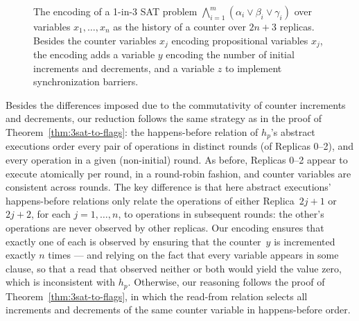     \begin{figure}[t]
      \centering
      {\scriptsize}
     \vspace{-1mm}
      \caption{The encoding of a 1-in-3 SAT problem $\bigwedge_{i=1}^{m} (\alpha_i \lor \beta_i \lor \gamma_i)$ over variables $x_1, \ldots, x_n$ as the history of a counter over $2n+3$ replicas. Besides the counter variables $x_j$ encoding propositional variables $x_j$, the encoding adds a variable $y$ encoding the number of initial increments and decrements, and a variable $z$ to implement synchronization barriers.}
      \label{fig:3sat-to-counter}
     \vspace{-4mm}
    \end{figure}

     Besides the differences imposed due to the commutativity of counter increments and decrements, our reduction follows the same strategy as in the proof of Theorem~\ref{thm:3sat-to-flags}: the happens-before relation of $h_p$’s abstract executions order every pair of operations in distinct rounds (of Replicas 0–2), and every operation in a given (non-initial) round. As before, Replicas 0–2 appear to execute atomically per round, in a round-robin fashion, and counter variables are consistent across rounds. The key difference is that here abstract executions’ happens-before relations only relate the operations of either Replica~$2j\!+\!1$ or $2j\!+\!2$, for each $j = 1, \ldots, n$, to operations in subsequent rounds: the other’s operations are never observed by other replicas. Our encoding ensures that exactly one of each is observed by ensuring that the counter~$y$ is incremented exactly $n$ times — and relying on the fact that every variable appears in some clause, so that a read that observed neither or both would yield the value zero, which is inconsistent with $h_p$. Otherwise, our reasoning follows the proof of Theorem~\ref{thm:3sat-to-flags}, in which the read-from relation selects all increments and decrements of the same counter variable in happens-before order.
\vspace{-2mm}



